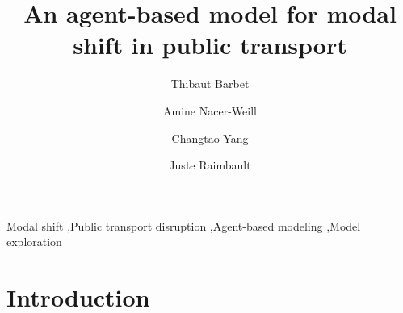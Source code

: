 \documentclass[3p,times,procedia]{elsarticle}
\begin{document}
\begin{frontmatter}


\title{An agent-based model for modal shift in public transport}

\author[a]{Thibaut Barbet}
\author[a]{Amine Nacer-Weill}
\author[a]{Changtao Yang}
\author[b]{Juste Raimbault}

\address[a]{Ecole des Ponts ParisTech, Champs-sur-Marne, France}
\address[b]{CASA, University College London, London, United Kingdom}

\begin{abstract}

\end{abstract}

\begin{keyword}
Modal shift \sep Public transport disruption \sep Agent-based modeling \sep Model exploration
\end{keyword}
\end{frontmatter}




\section{Introduction}


\end{document}
